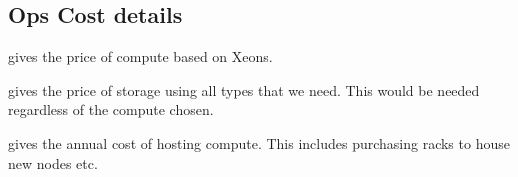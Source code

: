 \subsection{Ops Cost details}\label{sec:opsdetails}
 gives the price of compute based on Xeons.

 gives the price of storage using all  types that we need.
This would be needed regardless of the compute chosen.
\begin{landscape}


\end{landscape}

 gives the annual cost of hosting compute. This includes purchasing racks to house
new nodes etc.
\begin{landscape}

\end{landscape}


